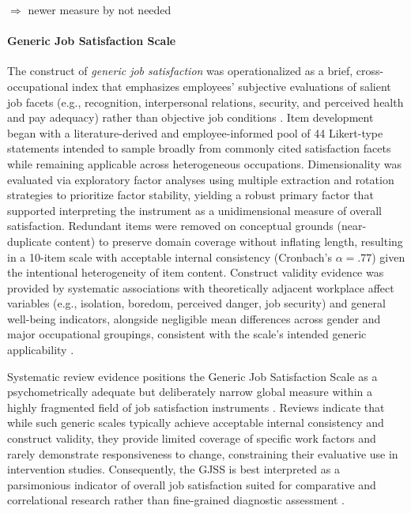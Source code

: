 \documentclass[jou,floatsintext]{apa7}
\begin{document}
$\Rightarrow$ newer measure by \textcite{margolisNewMeasureLife2019} not needed



\paragraph{Generic Job Satisfaction Scale}

The construct of \emph{generic job satisfaction} was operationalized as a brief, cross-occupational index that emphasizes employees' subjective evaluations of salient job facets (e.g., recognition, interpersonal relations, security, and perceived health and pay adequacy) rather than objective job conditions \parencite{macdonaldGenericJobSatisfaction1997}. Item development began with a literature-derived and employee-informed pool of 44 Likert-type statements intended to sample broadly from commonly cited satisfaction facets while remaining applicable across heterogeneous occupations. Dimensionality was evaluated via exploratory factor analyses using multiple extraction and rotation strategies to prioritize factor stability, yielding a robust primary factor that supported interpreting the instrument as a unidimensional measure of overall satisfaction. Redundant items were removed on conceptual grounds (near-duplicate content) to preserve domain coverage without inflating length, resulting in a 10-item scale with acceptable internal consistency (Cronbach's $\alpha=.77$) given the intentional heterogeneity of item content. Construct validity evidence was provided by systematic associations with theoretically adjacent workplace affect variables (e.g., isolation, boredom, perceived danger, job security) and general well-being indicators, alongside negligible mean differences across gender and major occupational groupings, consistent with the scale's intended generic applicability \parencite{macdonaldGenericJobSatisfaction1997}.

Systematic review evidence positions the Generic Job Satisfaction Scale as a psychometrically adequate but deliberately narrow global measure within a highly fragmented field of job satisfaction instruments \parencite{vansaaneReliabilityValidityInstruments2003}. Reviews indicate that while such generic scales typically achieve acceptable internal consistency and construct validity, they provide limited coverage of specific work factors and rarely demonstrate responsiveness to change, constraining their evaluative use in intervention studies. Consequently, the GJSS is best interpreted as a parsimonious indicator of overall job satisfaction suited for comparative and correlational research rather than fine-grained diagnostic assessment \parencite{vansaaneReliabilityValidityInstruments2003}.
\end{document}
